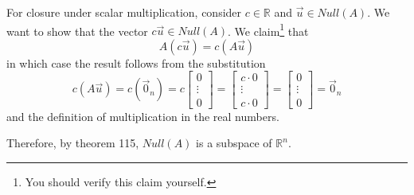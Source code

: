 \documentclass{exam}
\begin{document}
For closure under scalar multiplication, consider $c\in\mathbb{R}$ and $\Vec{u}\in Null(A)$. We want to show that the vector $c\Vec{u}\in Null(A)$. We claim\footnote{You should verify this claim yourself.} that $$A(c\Vec{u})=c(A\Vec{u})$$ in which case the result follows from the substitution $$c(A\Vec{u})=c(\Vec{0}_n)=c\left[\begin{array}{c} 0 \\ \vdots \\ 0\end{array}\right]=\left[\begin{array}{c} c\cdot 0 \\ \vdots \\ c\cdot 0\end{array}\right]=\left[\begin{array}{c} 0 \\ \vdots \\ 0\end{array}\right]=\Vec{0}_n$$ and the definition of multiplication in the real numbers. 

Therefore, by theorem 115, $Null(A)$ is a subspace of $\mathbb{R}^n$.
\end{document}

